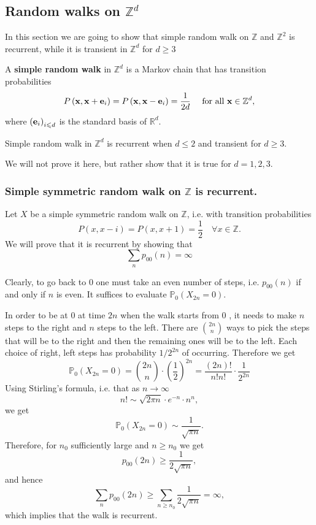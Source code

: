 \documentclass[a4paper,11pt]{article}
\begin{document}
\subsection{Random walks on $ \mathbb{Z}^d $}
In this section we are going to show that simple random walk on $\mathbb{Z}$ and $\mathbb{Z}^2$ is recurrent, while it is transient in $\mathbb{Z}^d$ for $d \geq 3$
\begin{definition}
    A \textbf{simple random walk} in $\mathbb{Z}^d$ is a Markov chain that has transition probabilities
    \[
    P\left({\bf x}, {\bf x}+{\bf e}_i\right)=P\left({\bf x}, {\bf x}-{\bf e}_i\right)=\frac{1}{2 d} \quad \text { for all } {\bf x} \in \mathbb{Z}^d,
    \]
    where $\left({\bf e}_i\right)_{i \leqslant d}$ is the standard basis of $\mathbb{R}^d$.
\end{definition}

\begin{theorem}[Polya]
    Simple random walk in $\mathbb{Z}^d$ is recurrent when $d \leq 2$ and transient for $d \geq 3$.
\end{theorem}

We will not prove it here, but rather show that it is true for $d=1,2,3$. 

\subsubsection*{Simple symmetric random walk on $ \mathbb{Z} $ is recurrent.}
Let $X$ be a simple symmetric random walk on $\mathbb{Z}$, i.e. with transition probabilities
\[
P(x, x-i)=P(x, x+1)=\frac{1}{2} \quad \forall x \in \mathbb{Z} .
\]
We will prove that it is recurrent by showing that
\[
\sum_n p_{00}(n)=\infty
\]

Clearly, to go back to 0 one must take an even number of steps, i.e. $p_{00}(n)$ if and only if $n$ is even. It suffices to evaluate $ \mathbb{P}_0(X_{2n}=0) $.

In order to be at 0 at time $2 n$ when the walk starts from 0 , it needs to make $n$ steps to the right and $n$ steps to the left. There are $\binom{2n}{n}$ ways to pick the steps that will be to the right and then the remaining ones will be to the left. Each choice of right, left steps has probability $1/2^{2 n}$ of occurring. Therefore we get
\[
\mathbb{P}_0\left(X_{2 n}=0\right)=\binom{2n}{n} \cdot\left(\frac{1}{2}\right)^{2 n}=\frac{(2 n) !}{n ! n !} \cdot \frac{1}{2^{2 n}}
\]
Using Stirling's formula, i.e. that as $n \rightarrow \infty$
\[
n ! \sim \sqrt{2 \pi n} \cdot e^{-n} \cdot n^n,
\]
we get
\[
\mathbb{P}_0\left(X_{2 n}=0\right) \sim \frac{1}{\sqrt{\pi n}} .
\]
Therefore, for $n_0$ sufficiently large and $n \geq n_0$ we get
\[
p_{00}(2 n) \geq \frac{1}{2 \sqrt{\pi n}},
\]
and hence
\[
\sum_n p_{00}(2 n) \geq \sum_{n \geq n_0} \frac{1}{2 \sqrt{\pi n}}=\infty,
\]
which implies that the walk is recurrent.
\end{document}
